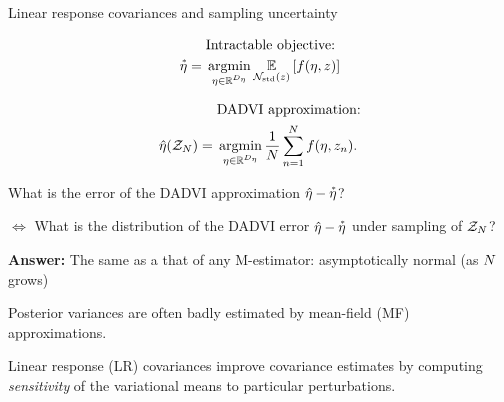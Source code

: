 \documentclass[8pt]{beamer}\usepackage[]{graphicx}\usepackage[]{color}
\begin{document}
\begin{frame}{Linear response covariances and sampling uncertainty}
%



\vspace{-2em}

\begin{minipage}[t]{0.48\textwidth}
    \begin{align*}
        &\text{Intractable objective:} 
        \\ \etastar %
            ={}& 
            \argmin_{\eta \in \etadom} \expect{\normz}{f(\eta, \z)}
    \end{align*}    
\end{minipage}
\begin{minipage}[t]{0.48\textwidth}
    \begin{align*}
        &\text{DADVI approximation:} 
        \\ \etahat(\Z) %
         ={}&  \argmin_{\eta \in \etadom} \meann f(\eta, \z_n).
    \end{align*}
\end{minipage}
%


\hrulefill

What is the error of the DADVI approximation $\hat{\eta} - \accentset{*}{\eta}$?

\pause

$\Leftrightarrow$ What is the distribution of the
DADVI error $\hat{\eta} - \accentset{*}{\eta}$ under sampling of $\mathcal{Z}_{N}$?

\textbf{Answer: } The same as a that of any M-estimator: 
    asymptotically normal (as $N$ grows) 

\pause

\hrulefill


Posterior variances are often badly estimated by mean-field (MF) approximations.

Linear response (LR) covariances improve covariance estimates by computing
\textit{sensitivity} of the variational means to 
particular perturbations.  \citep{giordano:2018:covariances}


\end{frame}
\end{document}
